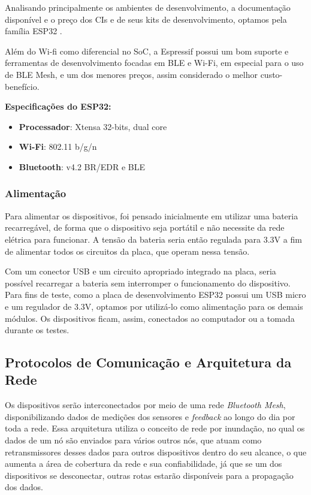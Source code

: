 \documentclass[../monografia.tex]{subfiles}
\begin{document}
Analisando principalmente os ambientes de desenvolvimento, a documentação disponível e o preço dos CIs e de seus kits de desenvolvimento, optamos pela família ESP32 \cite{ESP32}. 

Além do Wi-fi como diferencial no SoC, a Espressif possui um bom suporte e ferramentas de desenvolvimento focadas em BLE e Wi-Fi, em especial para o uso de BLE Mesh, e um dos menores preços, assim considerado o melhor custo-benefício. 

\textbf{Especificações do ESP32:} \cite{ESP-datasheet}
\begin{itemize}
\item \textbf{Processador}: Xtensa 32-bits, dual core
\item \textbf{Wi-Fi}: 802.11 b/g/n
\item \textbf{Bluetooth}: v4.2 BR/EDR e BLE
\end{itemize}



\subsubsection{Alimentação}

Para alimentar os dispositivos, foi pensado inicialmente em utilizar uma bateria recarregável, de forma que o dispositivo seja portátil e não necessite da rede elétrica para funcionar. A tensão da bateria seria então regulada para 3.3V a fim de alimentar todos os circuitos da placa, que operam nessa tensão. 

Com um conector USB e um circuito apropriado integrado na placa, seria possível recarregar a bateria sem interromper o funcionamento do dispositivo. Para fins de teste, como a placa de desenvolvimento ESP32 possui um USB micro e um regulador de 3.3V, optamos por utilizá-lo como alimentação para os demais módulos. Os dispositivos ficam, assim, conectados ao computador ou a tomada durante os testes.

\subsection{Protocolos de Comunicação e Arquitetura da Rede}

Os dispositivos serão interconectados por meio de uma rede \textit{Bluetooth Mesh}, disponibilizando dados de medições dos sensores e \textit{feedback} ao longo do dia por toda a rede. Essa arquitetura utiliza o conceito de rede por inundação, no qual os dados de um nó são enviados para vários outros nós, que atuam como retransmissores desses dados para outros dispositivos dentro do seu alcance, o que aumenta a área de cobertura da rede e sua confiabilidade, já que se um dos dispositivos se desconectar, outras rotas estarão disponíveis para a propagação dos dados.
\end{document}
